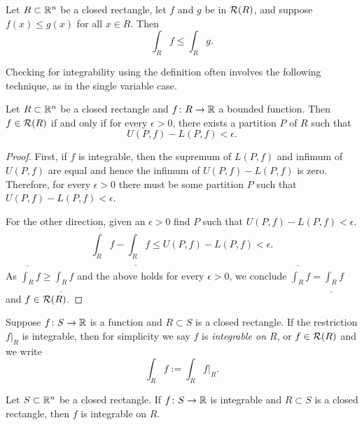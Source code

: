 \begin{prop}[Monotonicity]
Let $R \subset {\mathbb{R}}^n$ be a closed rectangle, let
$f$ and $g$ be in ${\mathcal{R}}(R)$, and suppose $f(x) \leq g(x)$
for all $x \in R$.  Then
\begin{equation*}
\int_R f 
\leq
\int_R g .
\end{equation*}
\end{prop}

Checking for integrability using the definition often involves the following
technique, as in the single variable case.

\begin{prop} \label{mv:prop:upperlowerepsilon}
Let $R \subset {\mathbb{R}}^n$ be a closed rectangle and
$f \colon R \to {\mathbb{R}}$ a bounded function.
Then $f \in {\mathcal{R}}(R)$ if and only if
for every $\epsilon > 0$, there exists a partition $P$ of $R$
such that
\begin{equation*}
U(P,f) - L(P,f) < \epsilon .
\end{equation*}
\end{prop}

\begin{proof}
First, if $f$ is integrable, then the supremum of $L(P,f)$ and
infimum of $U(P,f)$ are equal and hence the
infimum of $U(P,f)-L(P,f)$ is zero.  Therefore, for
every $\epsilon > 0$ there must be some partition $P$ such that 
$U(P,f) - L(P,f) < \epsilon$.

For the other direction, given an $\epsilon > 0$ find $P$ such that
$U(P,f) - L(P,f) < \epsilon$.
\begin{equation*}
\overline{\int_R} f - 
\underline{\int_R} f 
\leq
U(P,f) - L(P,f)
< \epsilon .
\end{equation*}
As $\overline{\int_R} f \geq \underline{\int_R} f$ and the above holds for
every $\epsilon > 0$, we conclude 
$\overline{\int_R} f = \underline{\int_R} f$ and $f \in {\mathcal{R}}(R)$.
\end{proof}

Suppose $f \colon S \to {\mathbb{R}}$ is a function and $R \subset S$
is a closed rectangle.  If the restriction $f|_R$ is integrable,
then for simplicity we
say $f$ is \emph{integrable on $R$}, or
$f \in {\mathcal{R}}(R)$ and we
write
\begin{equation*}
\int_R f := \int_R f|_R .
\end{equation*}

\begin{prop} \label{mv:prop:integralsmallerset}
Let $S \subset {\mathbb{R}}^n$ be a closed rectangle.
If $f \colon S \to {\mathbb{R}}$ is integrable and $R \subset S$
is a closed rectangle, then $f$ is integrable on $R$.
\end{prop}

